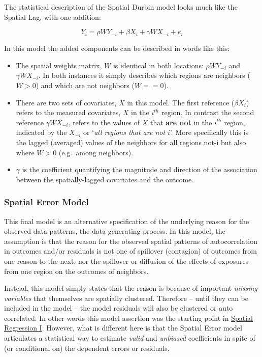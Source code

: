 \documentclass[
]{book}
\providecommand{\tightlist}{%
  \setlength{\itemsep}{0pt}\setlength{\parskip}{0pt}}
\begin{document}
The statistical description of the Spatial Durbin model looks much like the Spatial Lag, with one addition:

\[Y_i=\rho WY_{-i} + \beta X_i + \gamma WX_{-i} + e_i\]

In this model the added components can be described in words like this:

\begin{itemize}
\tightlist
\item
  The spatial weights matrix, \(W\) is identical in both locations: \(\rho WY_{-i}\) and \(\gamma WX_{-i}\). In both instances it simply describes which regions are neighbors (\(W>0\)) and which are not neighbors (\(W==0\)).
\item
  There are two sets of covariates, \(X\) in this model. The first reference (\(\beta X_i\)) refers to the measured covariates, \(X\) in the \(i^{th}\) region. In contrast the second reference \(\gamma WX_{-i}\), refers to the values of \(X\) that \textbf{are not} in the \(i^{th}\) region, indicated by the \(X_{-i}\) or `\emph{all regions that are not \(i\)}'. More specifically this is the lagged (averaged) values of the neighbors for all regions not-i but also where \(W>0\) (e.g.~among neighbors).
\item
  \(\gamma\) is the coefficient quantifying the magnitude and direction of the association between the spatially-lagged covariates and the outcome.
\end{itemize}

\hypertarget{spatial-error-model}{%
\subsubsection{Spatial Error Model}\label{spatial-error-model}}

This final model is an alternative specification of the underlying reason for the observed data patterns, the data generating process. In this model, the assumption is that the reason for the observed spatial patterns of autocorrelation in outcomes and/or residuals is not one of spillover (contagion) of outcomes from one reason to the next, nor the spillover or diffusion of the effects of exposures from one region on the outcomes of neighbors.

Instead, this model simply states that the reason is because of important \emph{missing variables} that themselves are spatially clustered. Therefore -- until they can be included in the model -- the model residuals will also be clustered or auto correlated. In other words this model assertion was the starting point in \protect\hyperlink{spatreg1}{Spatial Regression I}. However, what is different here is that the Spatial Error model articulates a statistical way to estimate \emph{valid} and \emph{unbiased} coefficients in spite of (or conditional on) the dependent errors or residuals.
\end{document}
